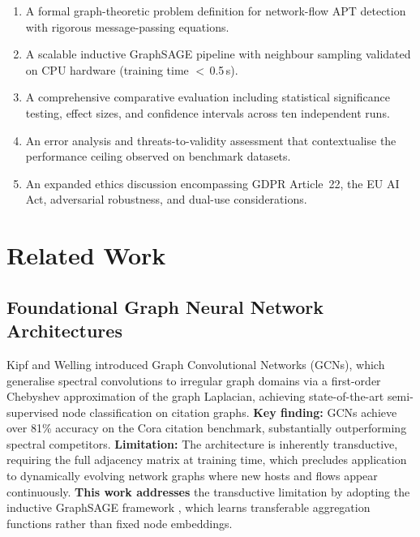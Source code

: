 \documentclass[conference]{IEEEtran}
\begin{document}
\begin{enumerate}
    \item A formal graph-theoretic problem definition for network-flow APT
    detection with rigorous message-passing equations.
    \item A scalable inductive GraphSAGE pipeline with neighbour sampling
    validated on CPU hardware (training time $<$\,0.5\,s).
    \item A comprehensive comparative evaluation including statistical
    significance testing, effect sizes, and confidence intervals across ten
    independent runs.
    \item An error analysis and threats-to-validity assessment that
    contextualise the performance ceiling observed on benchmark datasets.
    \item An expanded ethics discussion encompassing GDPR Article~22, the EU
    AI Act, adversarial robustness, and dual-use considerations.
\end{enumerate}

\section{Related Work}

\subsection{Foundational Graph Neural Network Architectures}

Kipf and Welling \cite{kipf2017} introduced Graph Convolutional Networks
(GCNs), which generalise spectral convolutions to irregular graph domains via a
first-order Chebyshev approximation of the graph Laplacian, achieving
state-of-the-art semi-supervised node classification on citation graphs.
\textbf{Key finding:} GCNs achieve over 81\% accuracy on the Cora citation
benchmark, substantially outperforming spectral competitors.
\textbf{Limitation:} The architecture is inherently transductive, requiring the
full adjacency matrix at training time, which precludes application to
dynamically evolving network graphs where new hosts and flows appear
continuously. \textbf{This work addresses} the transductive limitation by
adopting the inductive GraphSAGE framework \cite{hamilton2017}, which learns
transferable aggregation functions rather than fixed node embeddings.
\end{document}
